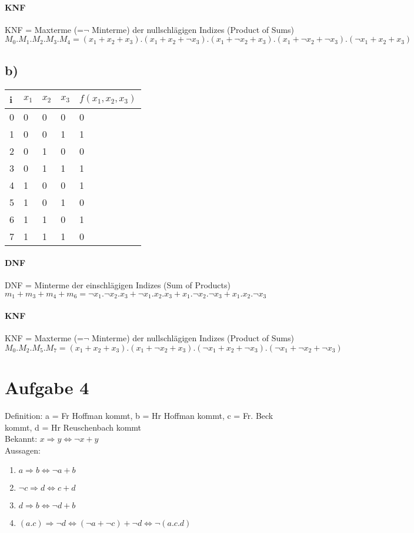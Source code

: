 \paragraph{KNF}
KNF = Maxterme (=$\neg$ Minterme) der nullschlägigen Indizes (Product of Sums)\\
$M_0 . M_1 . M_2 . M_3 . M_4 = (x_1+x_2+x_3) . (x_1+x_2+\neg x_3) . (x_1+\neg x_2+x_3) . (x_1+\neg x_2+\neg x_3) . (\neg x_1+x_2+x_3)$

\subsection{b)}
\begin{tabular}{|l||l|l|l||l|}\hline
i & $x_1$ & $x_2$ & $x_3$ & $f(x_1,x_2,x_3)$ \\\hline\hline
0 & 0 & 0 & 0 & 0 \\\hline
1 & 0 & 0 & 1 & 1 \\\hline
2 & 0 & 1 & 0 & 0 \\\hline
3 & 0 & 1 & 1 & 1 \\\hline
4 & 1 & 0 & 0 & 1 \\\hline
5 & 1 & 0 & 1 & 0 \\\hline
6 & 1 & 1 & 0 & 1 \\\hline
7 & 1 & 1 & 1 & 0 \\\hline
\end{tabular}

\paragraph{DNF}
DNF = Minterme der einschlägigen Indizes (Sum of Products)\\
$m_1 + m_3 + m_4 + m_6 = \neg x_1.\neg x_2.x_3 + \neg x_1.x_2.x_3 + x_1.\neg x_2.\neg x_3 + x_1.x_2.\neg x_3$

\paragraph{KNF}
KNF = Maxterme (=$\neg$ Minterme) der nullschlägigen Indizes (Product of Sums)\\
$M_0 . M_2 . M_5 . M_7  = (x_1+x_2+x_3) . (x_1+\neg x_2+x_3) . (\neg x_1+x_2+\neg x_3) . (\neg x_1+\neg x_2+\neg x_3)$


\section{Aufgabe 4}
Definition: a = Fr Hoffman kommt, b = Hr Hoffman kommt, c = Fr. Beck kommt, d = Hr Reuschenbach kommt\\
Bekannt: $x \Rightarrow y \Longleftrightarrow \neg x + y$\\
Aussagen: 
\begin{enumerate}
 \item $a \Rightarrow b \Longleftrightarrow \neg a + b$ 
 \item $\neg c \Rightarrow d \Longleftrightarrow c + d$
 \item $d \Rightarrow b \Longleftrightarrow \neg d + b$
 \item $(a.c) \Rightarrow \neg d \Longleftrightarrow (\neg a+\neg c) + \neg d \Longleftrightarrow \neg (a.c.d)$
\end{enumerate}
